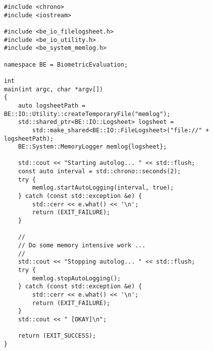 \begin{lstlisting}[caption={Using the \namespace{System::MemoryLogger} Class}, label=lst:memloggeruse] 
#include <chrono>
#include <iostream>

#include <be_io_filelogsheet.h>
#include <be_io_utility.h>
#include <be_system_memlog.h>

namespace BE = BiometricEvaluation;

int
main(int argc, char *argv[])
{
	auto logsheetPath = BE::IO::Utility::createTemporaryFile("memlog");
	std::shared_ptr<BE::IO::Logsheet> logsheet =
	    std::make_shared<BE::IO::FileLogsheet>("file://" + logsheetPath);
	BE::System::MemoryLogger memlog{logsheet};

	std::cout << "Starting autolog... " << std::flush;
	const auto interval = std::chrono::seconds(2);
	try {
		memlog.startAutoLogging(interval, true);
	} catch (const std::exception &e) {
		std::cerr << e.what() << '\n';
		return (EXIT_FAILURE);
	}

	//
	// Do some memory intensive work ...
	//
	std::cout << "Stopping autolog... " << std::flush;
	try {
		memlog.stopAutoLogging();
	} catch (const std::exception &e) {
		std::cerr << e.what() << '\n';
		return (EXIT_FAILURE);
	}
	std::cout << " [OKAY]\n";

	return (EXIT_SUCCESS);
}
\end{lstlisting}
